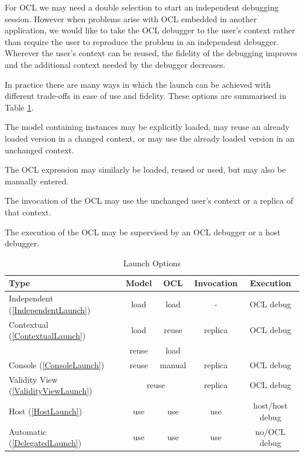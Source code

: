 \documentclass[a4paper]{article}
\begin{document}
For OCL we may need a double selection to start an independent debugging session. However when problems arise with OCL embedded in another application, we would like to take the OCL debugger to the user's context rather than require the user to reproduce the problem in an independent debugger. Wherever the user's context can be reused, the fidelity of the debugging improves and the additional context needed by the debugger decreases.

In practice there are many ways in which the launch can be achieved with different trade-offs in ease of use and fidelity. These options are summarised in Table \ref{LaunchOptions}.

The model containing instances may be explicitly loaded, may reuse an already loaded version in a changed context, or may use the already loaded version in an unchanged context.

The OCL expression may similarly be loaded, reused or used, but may also be manually entered.

The invocation of the OCL may use the unchanged user's context or a replica of that context.

The execution of the OCL may be supervised by an OCL debugger or a host debugger.

\begin{table}[ht]
\begin{center}
\caption{Launch Options}\label{LaunchOptions}
\bigskip
\begin{tabular}{|l|c|c|c|c|}
\hline
Type & Model & OCL & Invocation & Execution\\ \hline \hline
Independent (\ref{IndependentLaunch}) & load & load & - & OCL debug\\ \hline
Contextual (\ref{ContextualLaunch}) & load & reuse & replica & OCL debug\\ \cline{2-3}
 & reuse & load & & \\ \hline
Console (\ref{ConsoleLaunch}) & reuse & manual & replica & OCL debug\\ \hline
Validity View (\ref{ValidityViewLaunch}) & \multicolumn{2}{|c|}{reuse} & replica & OCL debug\\ \hline
Host (\ref{HostLaunch}) & use & use & use & host/host debug\\ \hline
Automatic (\ref{DelegatedLaunch}) & use & use & use & no/OCL debug\\ \hline
\end{tabular}
\end{center}
\end{table}
 
\end{document}
